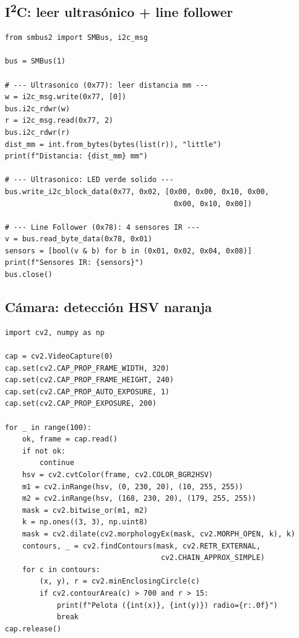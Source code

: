 \documentclass[11pt,a4paper]{article}
\begin{document}
\subsection{I\textsuperscript{2}C: leer ultras\'{o}nico + line follower}

\begin{lstlisting}[style=pystyle]
from smbus2 import SMBus, i2c_msg

bus = SMBus(1)

# --- Ultrasonico (0x77): leer distancia mm ---
w = i2c_msg.write(0x77, [0])
bus.i2c_rdwr(w)
r = i2c_msg.read(0x77, 2)
bus.i2c_rdwr(r)
dist_mm = int.from_bytes(bytes(list(r)), "little")
print(f"Distancia: {dist_mm} mm")

# --- Ultrasonico: LED verde solido ---
bus.write_i2c_block_data(0x77, 0x02, [0x00, 0x00, 0x10, 0x00,
                                       0x00, 0x10, 0x00])

# --- Line Follower (0x78): 4 sensores IR ---
v = bus.read_byte_data(0x78, 0x01)
sensors = [bool(v & b) for b in (0x01, 0x02, 0x04, 0x08)]
print(f"Sensores IR: {sensors}")
bus.close()
\end{lstlisting}

\subsection{C\'{a}mara: detecci\'{o}n HSV naranja}

\begin{lstlisting}[style=pystyle]
import cv2, numpy as np

cap = cv2.VideoCapture(0)
cap.set(cv2.CAP_PROP_FRAME_WIDTH, 320)
cap.set(cv2.CAP_PROP_FRAME_HEIGHT, 240)
cap.set(cv2.CAP_PROP_AUTO_EXPOSURE, 1)
cap.set(cv2.CAP_PROP_EXPOSURE, 200)

for _ in range(100):
    ok, frame = cap.read()
    if not ok:
        continue
    hsv = cv2.cvtColor(frame, cv2.COLOR_BGR2HSV)
    m1 = cv2.inRange(hsv, (0, 230, 20), (10, 255, 255))
    m2 = cv2.inRange(hsv, (168, 230, 20), (179, 255, 255))
    mask = cv2.bitwise_or(m1, m2)
    k = np.ones((3, 3), np.uint8)
    mask = cv2.dilate(cv2.morphologyEx(mask, cv2.MORPH_OPEN, k), k)
    contours, _ = cv2.findContours(mask, cv2.RETR_EXTERNAL,
                                    cv2.CHAIN_APPROX_SIMPLE)
    for c in contours:
        (x, y), r = cv2.minEnclosingCircle(c)
        if cv2.contourArea(c) > 700 and r > 15:
            print(f"Pelota ({int(x)}, {int(y)}) radio={r:.0f}")
            break
cap.release()
\end{lstlisting}
\end{document}
